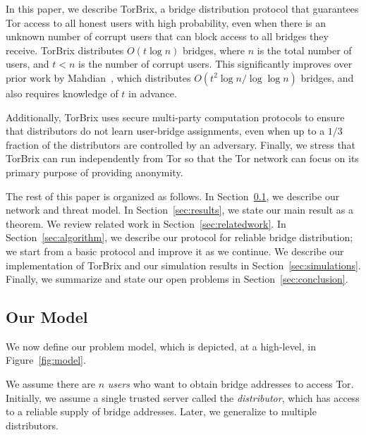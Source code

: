 \documentclass[letterpaper,twocolumn,10pt]{article}
\newcommand{\jared}[1]{}
\newcommand{\sfsize}{\fontsize{0.73\baselineskip}{0.73\baselineskip}\selectfont}
\newcommand{\sans}[1]{\textsf{\sfsize \mbox{#1}}}
\newcommand{\sansb}[1]{\textbf{\sans{\mbox{#1}}}}
\newcommand{\para}[1]{\vspace{0.55em} \noindent \sansb{{\mbox{#1}}}}
\newcommand{\brix}{\sans{TorBrix}\xspace}
\begin{document}
In this paper, we describe \brix, a bridge distribution protocol that guarantees Tor access to all honest users with high probability, even when there is an unknown number of corrupt users that can block access to all bridges they receive.  \brix distributes $O(t\log{n})$ bridges, where $n$ is the total number of users, and ${t < n}$ is the number of corrupt users.  This significantly improves over prior work by Mahdian~\cite{Mahdian:2010}, which distributes $O(t^2\log{n}/\log \log n)$ bridges, and also requires knowledge of $t$ in advance.


Additionally, \brix uses secure multi-party computation protocols to ensure that  distributors do not learn user-bridge assignments, even when up to a $1/3$ fraction of the distributors are controlled by an adversary.  Finally, we stress that \brix can run independently from Tor so that the Tor network can focus on its primary purpose of providing anonymity.

The rest of this paper is organized as follows. In Section~\ref{sec:model}, we describe our network and threat model. In Section~\ref{sec:results}, we state our main result as a theorem. We review related work in Section~\ref{sec:relatedwork}. In Section~\ref{sec:algorithm}, we describe our protocol for reliable bridge distribution; we start from a basic protocol and improve it as we continue. We describe our implementation of \brix and our simulation results in Section~\ref{sec:simulations}. Finally, we summarize and state our open problems in Section~\ref{sec:conclusion}.

\subsection{Our Model} \label{sec:model}

We now define our problem model, which is depicted, at a high-level, in Figure~\ref{fig:model}.



We assume there are $n$ \emph{users} who want to obtain bridge addresses to access Tor. Initially, we assume a single trusted server called the \emph{distributor}, which has access to a reliable supply of bridge addresses.  Later, we generalize to multiple distributors.
\end{document}
